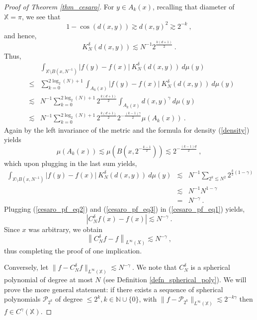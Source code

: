 \documentclass[12pt]{amsart}
\theoremstyle{definition}
\newcommand{\N}{\mathbb N}%
\newcommand{\X}{\mathbb X}%
\numberwithin{equation}{section}
\begin{document}
\begin{proof}[Proof of Theorem \ref{thm_cesaro}]
For $y \in A_k(x)$, recalling that diameter of $\X=\pi$, we see that
\begin{equation*}
1-\cos (d(x,y)) \gtrsim d(x,y)^2 \gtrsim 2^{-k} \:,
\end{equation*}
and hence,
\begin{equation*}
 K^\delta_N(d(x,y)) \lesssim N^{-1}2^{\frac{k(d+1)}{2}}\:.
\end{equation*}
Thus,
\begin{eqnarray*}
&&\int_{\X \setminus B\left(x,N^{-1}\right)}  |f(y)-f(x)|\:K^\delta_N(d(x,y))\:d\mu(y) \\
&\le & \sum_{k=0}^{2\log_2(N)+1} \int_{A_k(x)}  |f(y)-f(x)|\:K^\delta_N(d(x,y))\:d\mu(y) \\
& \lesssim & N^{-1} \sum_{k=0}^{2\log_2(N)+1} 2^{\frac{k(d+1)}{2}} \int_{A_k(x)} d(x,y)^\gamma\:d\mu(y) \\
& \lesssim & N^{-1} \sum_{k=0}^{2\log_2(N)+1} 2^{\frac{k(d+1)}{2}} 2^{-\frac{(k-1)\gamma}{2}}\mu\left(A_k(x)\right)\:. 
\end{eqnarray*}
Again by the left invariance of the metric and the formula for density (\ref{density}) yields 
\begin{equation*}
\mu\left(A_k(x)\right) \lesssim \mu\left(B\left(x,2^{-\frac{k-1}{2}}\right)\right) \lesssim 2^{-\frac{(k-1)d}{2}}\:,
\end{equation*}
which upon plugging in the last sum yields,
\begin{eqnarray} \label{cesaro_pf_eq3}
\int_{\X \setminus B\left(x,N^{-1}\right)}  |f(y)-f(x)|\:K^\delta_N(d(x,y))\:d\mu(y) & \lesssim & N^{-1} \sum_{2^k \lesssim N^2} 2^{\frac{k}{2}(1-\gamma)} \nonumber\\
& \lesssim & N^{-1} N^{1-\gamma} \nonumber\\
&=& N^{-\gamma}\:.
\end{eqnarray}
Plugging (\ref{cesaro_pf_eq2}) and (\ref{cesaro_pf_eq3}) in (\ref{cesaro_pf_eq1}) yields,
\begin{equation*}
\left|C^\delta_Nf(x)-f(x)\right| \lesssim N^{-\gamma}\:.
\end{equation*}
Since $x$ was arbitrary, we obtain
\begin{equation*}
\left\|C^\delta_Nf-f\right\|_{L^{\infty}(X)} \lesssim N^{-\gamma}\:,
\end{equation*}
thus completing the proof of one implication.

\medskip

Conversely, let $\|f-C^\delta_Nf\|_{L^\infty(\X)} \lesssim N^{-\gamma}\:.$ We note that $C^\delta_N$ is a spherical polynomial of degree at most $N$ (see Definition \ref{defn_spherical_poly}). We will prove the more general statement: if there exists a sequence of spherical polynomials $\mathcal{P}_{2^k}$ of degree $\le 2^k, k \in \N \cup \{0\}$, with $\|f-\mathcal{P}_{2^k}\|_{L^\infty(\X)} \lesssim 2^{-k\gamma}$ then $f \in C^\gamma(\X)$.


\end{proof}
\end{document}
